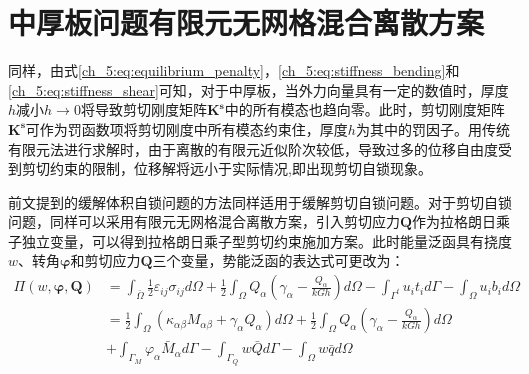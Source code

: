 \section{中厚板问题有限元无网格混合离散方案} 
同样，由式\eqref{ch_5:eq:equilibrium_penalty}，\eqref{ch_5:eq:stiffness_bending}和\eqref{ch_5:eq:stiffness_shear}可知，对于中厚板，当外力向量具有一定的数值时，厚度$h$减小$h\rightarrow 0$将导致剪切刚度矩阵$\boldsymbol{K^s}$中的所有模态也趋向零。此时，剪切刚度矩阵$\boldsymbol{K^s}$可作为罚函数项将剪切刚度中所有模态约束住，厚度$h$为其中的罚因子。用传统有限元法进行求解时，由于离散的有限元近似阶次较低，导致过多的位移自由度受到剪切约束的限制，位移解将远小于实际情况,即出现剪切自锁现象。  

前文提到的缓解体积自锁问题的方法同样适用于缓解剪切自锁问题。对于剪切自锁问题，同样可以采用有限元无网格混合离散方案，引入剪切应力$\boldsymbol{Q}$作为拉格朗日乘子独立变量，可以得到拉格朗日乘子型剪切约束施加方案。此时能量泛函具有挠度$w$、转角$\boldsymbol{\varphi}$和剪切应力$\boldsymbol{Q}$三个变量，势能泛函的表达式可更改为：
\begin{equation}\label{ch_5:eq:potential_energy_mixed}
    \begin{split} 
        \Pi(w,\boldsymbol{\varphi},\boldsymbol{Q})&=\int_{\bar\Omega}\frac{1}{2}\varepsilon_{ij}\sigma_{ij} d\Omega+\frac{1}{2}\int_{\Omega}Q_{\alpha}(\gamma_{\alpha}-\frac{Q_{\alpha}}{kGh})d\Omega-\int_{\Gamma^{t}} u_{i}t_{i}d\Gamma-\int_{\Omega} u_{i}b_{i}d\Omega\\
        &=\frac{1}{2}\int_{\Omega}(\kappa_{\alpha \beta}M_{\alpha \beta}+\gamma_{\alpha}Q_{\alpha})d\Omega+\frac{1}{2}\int_{\Omega}Q_{\alpha}(\gamma_{\alpha}-\frac{Q_{\alpha}}{kGh})d\Omega\\
        &+\int_{\Gamma_{M}}\varphi_{\alpha}{\bar{M}_{\alpha}}d\Gamma-\int_{\Gamma_{Q}}{w}\bar {Q}d\Gamma-\int_{\Omega} w\bar{q}d\Omega
    \end{split}
\end{equation}

